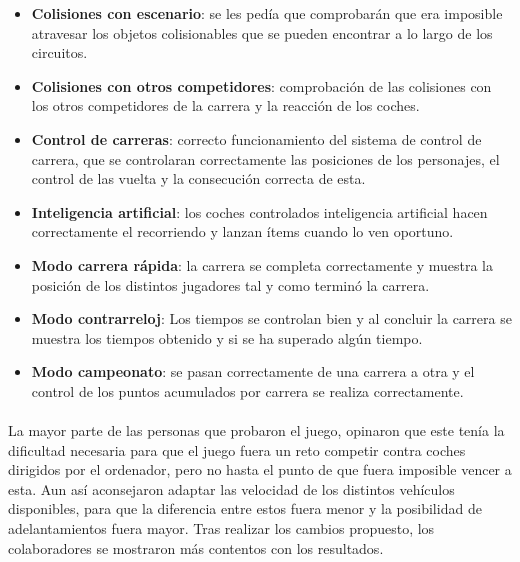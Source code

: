 \begin{itemize}
    \item \textbf{Colisiones con escenario}: se les pedía que comprobarán que era imposible atravesar los objetos colisionables
    que se pueden encontrar a lo largo de los circuitos.
    
    \item \textbf{Colisiones con otros competidores}: comprobación de las colisiones con los otros competidores de la carrera y la
    reacción de los coches.
    
    \item \textbf{Control de carreras}: correcto funcionamiento del sistema de control de carrera, que se controlaran 
    correctamente las posiciones de los personajes, el control de las vuelta y la consecución correcta de esta.
    
    \item \textbf{Inteligencia artificial}: los coches controlados inteligencia artificial hacen correctamente el recorriendo y 
    lanzan ítems cuando lo ven oportuno.
    
    \item \textbf{Modo carrera rápida}: la carrera se completa correctamente y muestra la posición de los distintos jugadores tal 
    y como terminó la carrera.
    
    \item \textbf{Modo contrarreloj}: Los tiempos se controlan bien y al concluir la carrera se muestra los tiempos obtenido y si se
    ha superado algún tiempo.
    
    \item \textbf{Modo campeonato}: se pasan correctamente de una carrera a otra y el control de los puntos acumulados por carrera
    se realiza correctamente.
\end{itemize}

\paragraph{}
La mayor parte de las personas que probaron el juego, opinaron que este tenía la dificultad necesaria para que el juego fuera un 
reto competir contra coches dirigidos por el ordenador, pero no hasta el punto de que fuera imposible vencer a esta. Aun así aconsejaron
adaptar las velocidad de los distintos vehículos disponibles, para que la diferencia entre estos fuera menor y la posibilidad
de adelantamientos fuera mayor. Tras realizar los cambios propuesto, los colaboradores se mostraron más contentos con los resultados.

